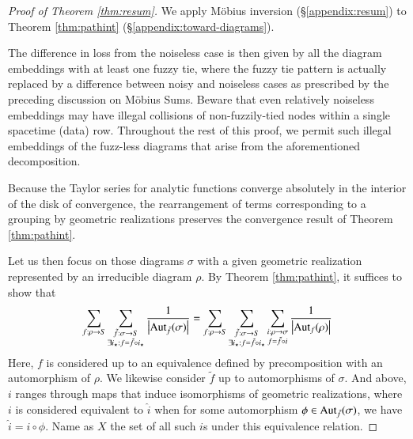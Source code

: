 \documentclass[openany, notitlepage, justified]{tufte-book}
\theoremstyle{plain}
\theoremstyle{definition}
\newcommand{\wabs}[1]{\left|#1\right|}
\newcommand{\Aut}{\text{\textnormal{Aut}}}
\begin{document}
        \begin{proof}[Proof of Theorem \ref{thm:resum}]
            We apply M\"obius inversion (\S\ref{appendix:resum}) to Theorem
            \ref{thm:pathint} (\S\ref{appendix:toward-diagrams}).
    
            The difference in loss from the noiseless case is then given by all
            the diagram embeddings with at least one fuzzy tie, where the fuzzy
            tie pattern is actually replaced by a difference between noisy and
            noiseless cases as prescribed by the preceding discussion on
            M\"obius Sums.  Beware that even relatively noiseless embeddings
            may have illegal collisions of non-fuzzily-tied nodes within a
            single spacetime (data) row.  Throughout the rest of this proof, we
            permit such illegal embeddings of the fuzz-less diagrams that arise
            from the aforementioned decomposition.  

            Because the Taylor series for analytic functions converge
            absolutely in the interior of the disk of convergence, the
            rearrangement of terms corresponding to a grouping by geometric
            realizations preserves the convergence result of Theorem
            \ref{thm:pathint}.  

            Let us then focus on those diagrams $\sigma$ with a given geometric
            realization represented by an irreducible diagram $\rho$.  By
            Theorem \ref{thm:pathint}, it suffices to show that
            \begin{equation} \label{eq:hard}
                \sum_{f:\rho\to S}
                \sum_{\substack{
                    \tilde f:\sigma\to S \\
                    \exists i_\star: f=\tilde f \circ i_\star
                }}
                \frac{1}{\wabs{\Aut_{\tilde f}(\sigma)}}
                =
                \sum_{f:\rho\to S}
                \sum_{\substack{
                    \tilde f:\sigma\to S \\
                    \exists i_\star: f=\tilde f \circ i_\star
                }}
                \sum_{\substack{
                    i:\rho\to\sigma \\
                    f = \tilde f \circ i
                }}
                \frac{1}{\wabs{\Aut_{f}(\rho)}}
            \end{equation}
            Here, $f$ is considered up to an equivalence defined by
            precomposition with an automorphism of $\rho$.  We likewise
            consider $\tilde f$ up to automorphisms of $\sigma$.  And above,
            $i$ ranges through maps that induce isomorphisms of geometric
            realizations, where $i$ is considered equivalent to $\hat i$ when
            for some automorphism $\phi \in \Aut_{\tilde f}(\sigma)$, we have
            $\hat i = i \circ \phi$.  Name as $X$ the set of all such $i$s
            under this equivalence relation.


\end{proof}
\end{document}
